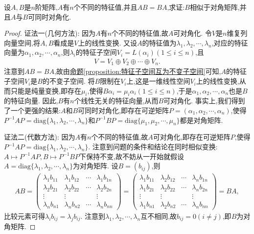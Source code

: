 \documentclass[../../main.tex]{subfiles}
\begin{document}
\begin{proposition}\label{proposition:可对角化矩阵与其他矩阵乘法可交换诱导可同时对角化}
设$A,B$是$n$阶矩阵,$A$有$n$个不同的特征值,并且$AB = BA$,求证:$B$相似于对角矩阵,并且$A$与$B$可同时对角化.
\end{proposition}
\begin{proof}
{\color{blue}证法一(几何方法):} 因为$A$有$n$个不同的特征值,故$A$可对角化. 令$V$是$n$维复列向量空间,将$A,B$看成是$V$上的线性变换. 又设$A$的特征值为$\lambda_1,\lambda_2,\cdots,\lambda_n$,对应的特征向量为$\alpha_1,\alpha_2,\cdots,\alpha_n$,则$\lambda_i$的特征子空间$V_i = L(\alpha_i)(1 \leqslant  i \leqslant  n)$,且
\begin{align*}
V = V_1 \oplus V_2 \oplus \cdots \oplus V_n.
\end{align*}
注意到$AB = BA$,故由\hyperref[proposition:特征子空间互为不变子空间]{命题\ref{proposition:特征子空间互为不变子空间}}可知,$A$的特征子空间$V_i$是$B$的不变子空间. 将$B$限制在$V_i$上,这是一维线性空间$V_i$上的线性变换,从而只能是纯量变换,即存在$\mu_i$,使得$B\alpha_i = \mu_i\alpha_i(1 \leqslant  i \leqslant  n)$,于是$\alpha_1,\alpha_2,\cdots,\alpha_n$也是$B$的特征向量. 因此,$B$有$n$个线性无关的特征向量,从而$B$可对角化. 事实上,我们得到了一个更强的结果:$A$和$B$可同时对角化,即存在可逆矩阵$P = (\alpha_1,\alpha_2,\cdots,\alpha_n)$,使得$P^{-1}AP = \mathrm{diag}\{\lambda_1,\lambda_2,\cdots,\lambda_n\}$和$P^{-1}BP = \mathrm{diag}\{\mu_1,\mu_2,\cdots,\mu_n\}$都是对角矩阵.

{\color{blue}证法二(代数方法):}
 因为$A$有$n$个不同的特征值,故$A$可对角化,即存在可逆矩阵$P$,使得$P^{-1}AP = \mathrm{diag}\{\lambda_1,\lambda_2,\cdots,\lambda_n\}$. 注意到问题的条件和结论在同时相似变换:$A \mapsto P^{-1}AP,B \mapsto P^{-1}BP$下保持不变,故不妨从一开始就假设$A = \mathrm{diag}\{\lambda_1,\lambda_2,\cdots,\lambda_n\}$为对角矩阵. 设$B = (b_{ij})$,则
\begin{align*}
AB=\begin{pmatrix}
\lambda_1b_{11}&\lambda_1b_{12}&\cdots&\lambda_1b_{1n}\\
\lambda_2b_{21}&\lambda_2b_{22}&\cdots&\lambda_2b_{2n}\\
\vdots&\vdots&&\vdots\\
\lambda_nb_{n1}&\lambda_nb_{n2}&\cdots&\lambda_nb_{nn}
\end{pmatrix}=\begin{pmatrix}
\lambda_1b_{11}&\lambda_2b_{12}&\cdots&\lambda_nb_{1n}\\
\lambda_1b_{21}&\lambda_2b_{22}&\cdots&\lambda_nb_{2n}\\
\vdots&\vdots&&\vdots\\
\lambda_1b_{n1}&\lambda_2b_{n2}&\cdots&\lambda_nb_{nn}
\end{pmatrix}=BA,
\end{align*}
比较元素可得$\lambda_ib_{ij} = \lambda_jb_{ij}$. 注意到$\lambda_1,\lambda_2,\cdots,\lambda_n$互不相同,故$b_{ij} = 0(i \neq j)$,即$B$为对角矩阵.
\end{proof}
\end{document}
